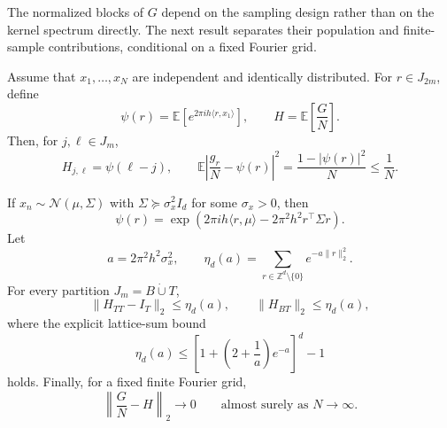 The normalized blocks of \(G\) depend on the sampling design rather than on
the kernel spectrum directly. The next result separates their population and
finite-sample contributions, conditional on a fixed Fourier grid.

\begin{proposition}
\label{prop:fourier-gram-population}
Assume that \(x_1,\ldots,x_N\) are independent and identically distributed.
For \(r\in J_{2m}\), define
\begin{equation}
    \psi(r)
    =\mathbb E\!\left[e^{2\pi i h\langle r,x_1\rangle}\right],
    \qquad
    H=\mathbb E\!\left[\frac{G}{N}\right].
    \label{eq:input-fourier-coefficient}
\end{equation}
Then, for \(j,\ell\in J_m\),
\begin{equation}
    H_{j,\ell}=\psi(\ell-j),
    \qquad
    \mathbb E\left|\frac{g_r}{N}-\psi(r)\right|^2
    =\frac{1-|\psi(r)|^2}{N}\leq\frac1N.
    \label{eq:population-fourier-gram}
\end{equation}

If \(x_n\sim\mathcal N(\mu,\Sigma)\) with
\(\Sigma\succeq\sigma_x^2I_d\) for some \(\sigma_x>0\), then
\begin{equation}
    \psi(r)
    =\exp\!\left(
        2\pi i h\langle r,\mu\rangle
        -2\pi^2h^2r^\top\Sigma r
    \right).
    \label{eq:gaussian-input-fourier-coefficient}
\end{equation}
Let
\begin{equation}
    a=2\pi^2h^2\sigma_x^2,
    \qquad
    \eta_d(a)=\sum_{r\in\mathbb Z^d\setminus\{0\}}e^{-a\|r\|_2^2}.
    \label{eq:gaussian-population-correlation}
\end{equation}
For every partition \(J_m=B\mathbin{\dot\cup}T\),
\begin{equation}
    \|H_{TT}-I_T\|_2\leq\eta_d(a),
    \qquad
    \|H_{BT}\|_2\leq\eta_d(a),
    \label{eq:gaussian-population-block-bounds}
\end{equation}
where the explicit lattice-sum bound
\begin{equation}
    \eta_d(a)
    \leq
    \left[1+\left(2+\frac1a\right)e^{-a}\right]^d-1
    \label{eq:gaussian-lattice-sum-bound}
\end{equation}
holds. Finally, for a fixed finite Fourier grid,
\begin{equation}
    \left\|\frac{G}{N}-H\right\|_2\longrightarrow0
    \qquad\text{almost surely as }N\to\infty.
    \label{eq:fourier-gram-convergence}
\end{equation}
\end{proposition}

